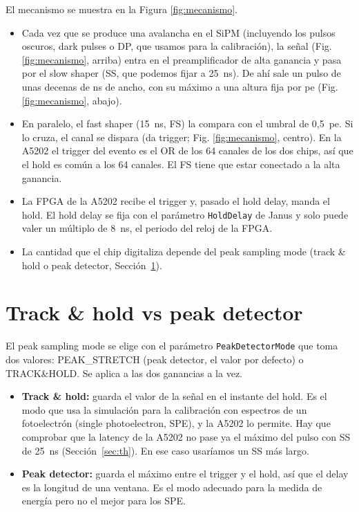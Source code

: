 \documentclass[11pt,a4paper]{article}
\begin{document}
El mecanismo se muestra en la Figura \ref{fig:mecanismo}. 

\begin{itemize}
\item Cada vez que se produce una avalancha en el SiPM (incluyendo los
  pulsos oscuros, dark pulses o DP, que usamos para la calibración), la señal (Fig. \ref{fig:mecanismo}, arriba)
  entra en el preamplificador de alta ganancia y pasa por el slow shaper (SS, que podemos
  fijar a 25~ns). De ahí sale un pulso de unas decenas de ns de ancho, con su
  máximo a una altura fija por pe (Fig. \ref{fig:mecanismo}, abajo).
\item En paralelo, el fast shaper (15~ns, FS) la compara con el umbral
  de 0,5~pe. Si lo cruza, el canal se dispara (da trigger; Fig. \ref{fig:mecanismo}, centro). En la A5202 el trigger del
  evento es el OR de los 64 canales de los dos chips, así que el hold es
  común a los 64 canales. El FS tiene que estar conectado a la alta
  ganancia.
\item La FPGA de la A5202 recibe el trigger y, pasado el hold delay, manda
  el hold. El hold delay se fija con el parámetro \texttt{HoldDelay} de Janus y solo
  puede valer un múltiplo de 8~ns, el periodo del reloj de la FPGA.
\item La cantidad que el chip digitaliza depende del peak sampling mode
  (track \& hold o peak detector, Sección~\ref{sec:modos}).
\end{itemize}

\section{Track \& hold vs peak detector}
\label{sec:modos}

El peak sampling mode se elige con el parámetro \texttt{PeakDetectorMode} que toma dos valores:
PEAK\_STRETCH (peak detector, el valor por defecto) o TRACK\&HOLD. Se
aplica a las dos ganancias a la vez.

\begin{itemize}
\item {\bf Track \& hold:} guarda el valor de la señal en el instante del
  hold. Es el modo que usa la simulación para la calibración con espectros
  de un fotoelectrón (single photoelectron, SPE), y la
  A5202 lo permite. Hay que comprobar que la latency de la A5202 no pase ya
  el máximo del pulso con SS de 25~ns (Sección~\ref{sec:th}). En ese caso usaríamos un SS más largo. 
\item {\bf Peak detector:} guarda el máximo entre el trigger y el hold, así
  que el delay es la longitud de una ventana. Es el modo adecuado para la
  medida de energía pero no el mejor para los SPE.
\end{itemize}
\end{document}
